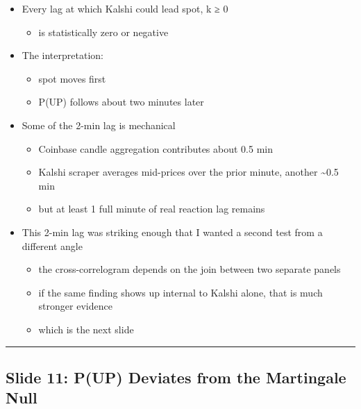 \documentclass[
]{article}
\providecommand{\tightlist}{%
  \setlength{\itemsep}{0pt}\setlength{\parskip}{0pt}}
\begin{document}
\begin{itemize}
  \begin{itemize}
  \tightlist
  \item
    so this is not a same-minute relationship I am splitting
  \end{itemize}
\item
  Every lag at which Kalshi could lead spot, k ≥ 0

  \begin{itemize}
  \tightlist
  \item
    is statistically zero or negative
  \end{itemize}
\item
  The interpretation:

  \begin{itemize}
  \tightlist
  \item
    spot moves first
  \item
    P(UP) follows about two minutes later
  \end{itemize}
\item
  Some of the 2-min lag is mechanical

  \begin{itemize}
  \tightlist
  \item
    Coinbase candle aggregation contributes about 0.5 min
  \item
    Kalshi scraper averages mid-prices over the prior minute, another
    \textasciitilde0.5 min
  \item
    but at least 1 full minute of real reaction lag remains
  \end{itemize}
\item
  This 2-min lag was striking enough that I wanted a second test from a
  different angle

  \begin{itemize}
  \tightlist
  \item
    the cross-correlogram depends on the join between two separate
    panels
  \item
    if the same finding shows up internal to Kalshi alone, that is much
    stronger evidence
  \item
    which is the next slide
  \end{itemize}
\end{itemize}

\begin{center}\rule{0.5\linewidth}{0.5pt}\end{center}

\subsection{Slide 11: P(UP) Deviates from the Martingale
Null}\label{slide-11-pup-deviates-from-the-martingale-null}
\end{document}
